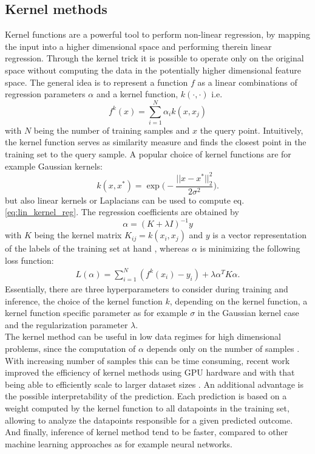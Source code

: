 \documentclass[9pt,bestpractices]{livecoms}
\begin{document}
\subsection{Kernel methods}
Kernel functions are a powerful tool to perform non-linear regression, by mapping the input into a higher dimensional space and performing therein linear regression. Through the kernel trick it is possible to operate only on the original space without computing the data in the potentially higher dimensional feature space. 
The general idea is to represent a function $f$ as a linear combinations of regression parameters $\alpha$ and a kernel function, $k( \cdot, \cdot)$ i.e.
\begin{equation}
    f^{k}(x) = \sum_{i=1}^{N} \alpha_i k(x, x_j)
    \label{eq:lin_kernel_reg}
\end{equation}
with $N$ being the number of training samples and $x$ the query point. Intuitively, the kernel function serves as similarity measure and finds the closest point in the training set to the query sample. 
A popular choice of kernel functions are for example Gaussian kernels:
\begin{equation*}
    k(x, x^{*}) = \exp \biggl( - \frac{|| x-x^{*} ||_{2}^2}{2 \sigma^2} \biggr).
\end{equation*}
but also linear kernels or Laplacians can be used to compute eq. \ref{eq:lin_kernel_reg}. The regression coefficients are obtained by
\begin{equation*}
    \alpha = (K + \lambda I)^{-1} y
\end{equation*}
with $K$ being the kernel matrix $K_{ij} = k(x_i, x_j)$ and $y$ is a vector representation of the labels of the training set at hand \cite{Vu2015}, whereas $\alpha$ is minimizing the following loss function:
\begin{align*}
    L(\alpha) = \sum_{i=1}^N (f^k(x_i) - y_i) + \lambda \alpha^T K \alpha.
\end{align*}
Essentially, there are three hyperparameters to consider during training and inference, the choice of the kernel function $k$, depending on the kernel function, a kernel function specific parameter as for example $\sigma$ in the Gaussian kernel case and the regularization parameter $\lambda$.
\\
The kernel method can be useful in low data regimes for high dimensional problems, since the computation of $\alpha$ depends only on the number of samples \cite{Murphy2013}. With increasing number of samples this can be time consuming, recent work improved the efficiency of kernel methods using GPU hardware and with that being able to efficiently scale to larger dataset sizes \cite{Meanti2020}.  An additional advantage is the possible interpretability of the prediction. Each prediction is based on a weight computed by the kernel function to all datapoints in the training set, allowing to analyze the datapoints responsible for a given predicted outcome. And finally, inference of kernel method tend to be faster, compared to other machine learning approaches as for example neural networks.  
\end{document}
